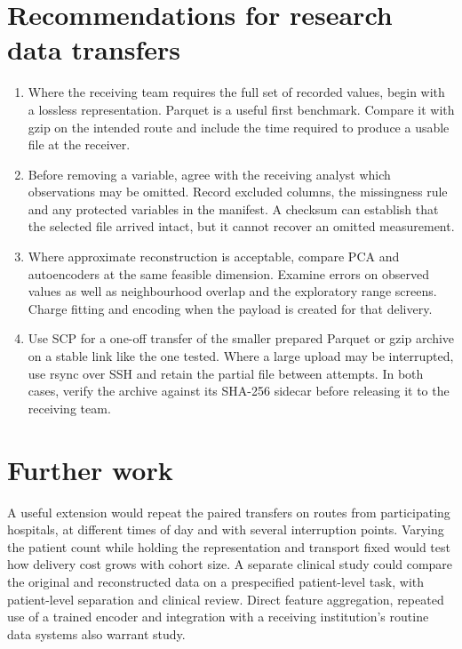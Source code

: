 \section{Recommendations for research data transfers}
\begin{enumerate}
\item Where the receiving team requires the full set of recorded values, begin with a lossless representation. Parquet is a useful first benchmark. Compare it with gzip on the intended route and include the time required to produce a usable file at the receiver.
\item Before removing a variable, agree with the receiving analyst which observations may be omitted. Record excluded columns, the missingness rule and any protected variables in the manifest. A checksum can establish that the selected file arrived intact, but it cannot recover an omitted measurement.
\item Where approximate reconstruction is acceptable, compare PCA and autoencoders at the same feasible dimension. Examine errors on observed values as well as neighbourhood overlap and the exploratory range screens. Charge fitting and encoding when the payload is created for that delivery.
\item Use SCP for a one-off transfer of the smaller prepared Parquet or gzip archive on a stable link like the one tested. Where a large upload may be interrupted, use rsync over SSH and retain the partial file between attempts. In both cases, verify the archive against its SHA-256 sidecar before releasing it to the receiving team.
\end{enumerate}

\section{Further work}
A useful extension would repeat the paired transfers on routes from participating hospitals, at different times of day and with several interruption points. Varying the patient count while holding the representation and transport fixed would test how delivery cost grows with cohort size. A separate clinical study could compare the original and reconstructed data on a prespecified patient-level task, with patient-level separation and clinical review. Direct feature aggregation, repeated use of a trained encoder and integration with a receiving institution's routine data systems also warrant study.
